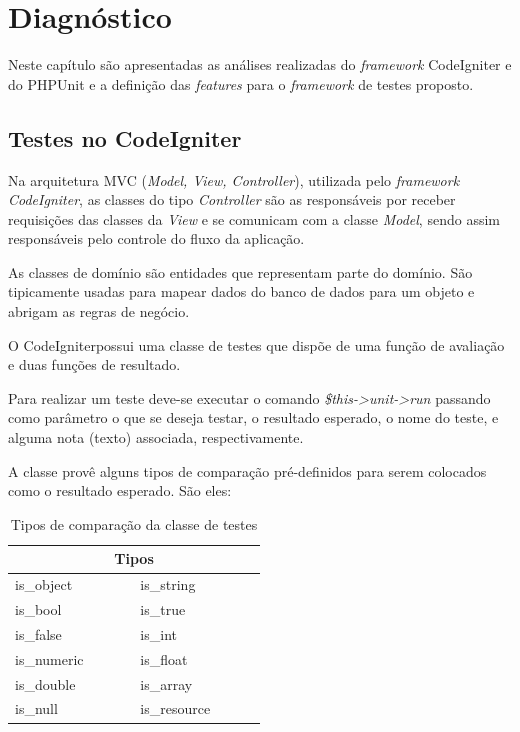 \chapter{Diagnóstico}

Neste capítulo são apresentadas as análises realizadas do \textit{framework} CodeIgniter e do PHPUnit e a definição das \textit{features} para o \textit{framework} de testes proposto.

    
\section{Testes no CodeIgniter}

Na arquitetura MVC (\textit{Model, View, Controller}), utilizada pelo \textit{framework} \textit{CodeIgniter}, as classes do tipo \textit{Controller} são as responsáveis por receber requisições das classes da \textit{View} e se comunicam com a classe \textit{Model}, sendo assim responsáveis pelo controle do fluxo da aplicação.

As classes de domínio são entidades que representam parte do domínio. São tipicamente usadas para mapear dados do banco de dados para um objeto e abrigam as regras de negócio.

O CodeIgniter\footnotemark possui uma classe de testes que dispõe de uma função de avaliação
e duas funções de resultado. 

Para realizar um teste deve-se executar o comando \textit{\$this->unit->run} passando como parâmetro
o que se deseja testar, o resultado esperado, o nome do teste, e alguma nota (texto) associada, respectivamente.

A classe provê alguns tipos de comparação pré-definidos para serem colocados como o resultado esperado. São eles:

\begin{table}[!h]
\caption{Tipos de comparação da classe de testes}
\label{table:tipos_comparacao}
\centering
\begin{tabular}{|p{0.25\linewidth}|p{0.25\linewidth}|}
  \hline
  \multicolumn{2}{|c|}{\textbf{Tipos}} \\
  \hline			
	is\_object & is\_string \\
  \hline
	is\_bool &	is\_true \\
  \hline
	is\_false & is\_int \\
  \hline
	is\_numeric & is\_float \\
  \hline
	is\_double & is\_array \\
  \hline
	is\_null &	is\_resource \\
  \hline
  \end{tabular}
\end{table}

